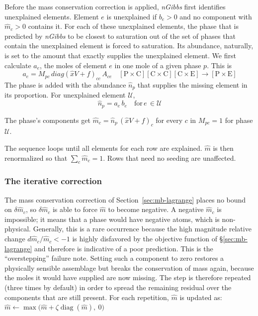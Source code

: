 Before the mass conservation correction is applied, \emph{nGibbs} first identifies unexplained elements. 
Element $e$ is unexplained if $b_e > 0$ and no component with $\hat m_c > 0$ contains it. For each
of these unexplained elements, the phase that is predicted by \emph{nGibbs} to be closest to saturation
out of the set of phases that contain the unexplained element is forced to saturation. Its abundance, naturally,
is set to the amount that exactly supplies the unexplained element. We first calculate $a_e$, the moles of element $e$ 
in one mole of a given phase $p$. This is 
        \begin{equation}
          a_e = M_{pc}\,diag(\hat x V + f)_{cc}\, A_{ce} 
          \quad [\text{P}\times\text{C}][\text{C}\times\text{C}][\text{C}\times\text{E}] \to [\text{P}\times\text{E}]
          \label{eq:seedcomp}
        \end{equation}
The phase is added with the abundance $\hat n_p$ that supplies the missing element in its proportion. 
For unexplained element $\mathcal{U}$, 
        \begin{equation}
          \hat n_p = a_e\,  b_e \quad \text{for}\, e\, \in \mathcal{U} 
          \label{eq:seed}
        \end{equation}
        
The phase's components get $\hat m_c = \hat n_p\,(\hat x V + f)_c$ for every $c$ in $M_{pc} = 1$ for 
phase $\mathcal{U}$.

The sequence loops until all elements for each row are explained. $\hat m$ is then renormalized so that
$\sum_c \hat m_c = 1$. Rows that need no seeding are unaffected.

\subsubsection{The iterative correction}
\label{sec:mb-iter}

The mass conservation correction of Section~\ref{sec:mb-lagrange} 
places no bound on $\delta\hat m_c$, so $\delta\hat m_c$ is able to force $\hat m$ to become negative. 
A negative $\hat m_c$ is impossible; it means that a phase would have negative atoms, which is non-physical. 
Generally, this is a rare occurrence because the high magnitude relative change $d \hat m_c /\hat m_c < -1$ is highly disfavored 
by the objective function of \S\ref{sec:mb-lagrange} and therefore is indicative of a poor prediction. This is the ``overstepping'' failure \citet{asimow1998} note. 
Setting such a component to zero restores a physically sensible assemblage but
breaks the conservation of mass again, because the moles it would have supplied are now missing.
The step is therefore repeated (three times by default) in order to spread the remaining residual over the
components that are still present. For each repetition, $\hat m$ is updated as:
$\hat m \leftarrow \max\big(\hat m + \zeta \operatorname{diag}(\hat m),\ 0\big)$

